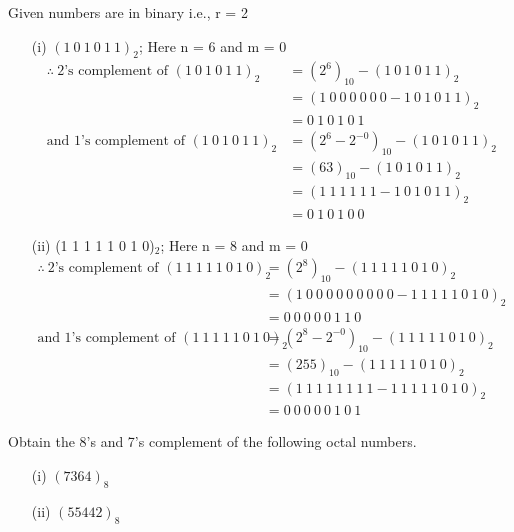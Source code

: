 \begin{solution}
Given numbers are in binary i.e., r = 2
\begin{itemize}
\item[(i)] $(1~0~1~0~1~1)_{2}$\qquad ; Here n = 6 and m = 0
\begin{align*}
\therefore~ \text{2's complement of } (1~0~1~0~1~1)_{2} &= (2^{6})_{10}-(1~0~1~0~1~1)_{2}\\[1pt]
&= (1~0~0~0~0~0~0-1~0~1~0~1~1)_{2}\\[1pt]
&= 0~1~0~1~0~1\\[1pt]
\text{and 1's complement of } (1~0~1~0~1~1)_{2} &= (2^{6}-2^{-0})_{10}-(1~0~1~0~1~1)_{2}\\[1pt]
&= (63)_{10}-(1~0~1~0~1~1)_{2}\\[1pt]
&= (1~1~1~1~1~1-1~0~1~0~1~1)_{2}\\[1pt]
&= 0~1~0~1~0~0
\end{align*}

\item[(ii)] (1 1 1 1 1 0 1 0)$_{2}$\qquad ; Here n = 8 and m = 0
\begin{align*}
\therefore~ \text{2's complement of } (1~1~1~1~1~0~1~0)_{2} &= (2^{8})_{10}-(1~1~1~1~1~0~1~0)_{2}\\[2pt]
&= (1~0~0~0~0~0~0~0~0~0-1~1~1~1~1~0~1~0)_{2}\\[2pt]
&= 0~0~0~0~0~1~1~0\\[2pt]
\text{and 1's complement of } (1~1~1~1~1~0~1~0)_{2} &= (2^{8}-2^{-0})_{10}-(1~1~1~1~1~0~1~0)_{2}\\[2pt]
&= (255)_{10}-(1~1~1~1~1~0~1~0)_{2}\\[2pt]
&= (1~1~1~1~1~1~1~1-1~1~1~1~1~0~1~0)_{2}\\[2pt]
&= 0~0~0~0~0~1~0~1
\end{align*}
\end{itemize}
\end{solution}

\begin{problem}\label{prob5.25}
Obtain the 8's and 7's complement of the following octal numbers.
\begin{itemize}
\item[(i)] $(7364)_{8}$

\item[(ii)] $(55442)_{8}$
\end{itemize}
\end{problem}

